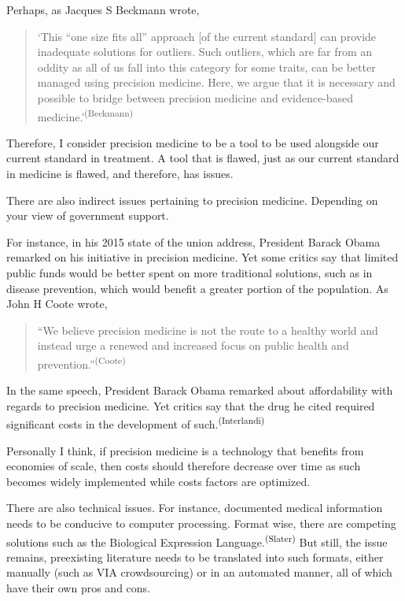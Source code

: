 Perhaps,  as Jacques S Beckmann wrote,
\begin{quotation}
`This ``one size fits all'' approach [of the current standard] can provide inadequate solutions for outliers. Such outliers, which are far from an oddity as all of us fall into this category for some traits, can be better managed using precision medicine. Here, we argue that it is necessary and possible to bridge between precision medicine and evidence-based medicine.'\textsuperscript{(Beckmann)}
\end{quotation}

Therefore, I consider precision medicine to be a tool to be used alongside our current standard in treatment. A tool that is flawed, just as our current standard in medicine is flawed, and therefore, has issues.

There are also indirect issues pertaining to precision medicine. Depending on your view of government support.

For instance, in his 2015 state of the union address, President Barack Obama remarked on his initiative in precision medicine. Yet some critics say that limited public funds would be better spent on more traditional solutions, such as in disease prevention, which would benefit a greater portion of the population. As John H Coote wrote,
\begin{quotation}
    ``We believe precision medicine is not the route to a healthy world and instead urge a renewed and increased focus on public health and prevention.''\textsuperscript{(Coote)}
\end{quotation}

In the same speech, President Barack Obama remarked about affordability with regards to precision medicine. Yet critics say that the drug he cited required significant costs in the development of such.\textsuperscript{(Interlandi)}

Personally I think, if precision medicine is a technology that benefits from economies of scale, then costs should therefore decrease over time as such becomes widely implemented while costs factors are optimized. 

There are also technical issues. For instance, documented medical information needs to be conducive to computer processing. Format wise, there are competing solutions such as the Biological Expression Language.\textsuperscript{(Slater)} But still, the issue remains, preexisting literature needs to be translated into such formats, either manually (such as VIA crowdsourcing) or in an automated manner, all of which have their own pros and cons. 

